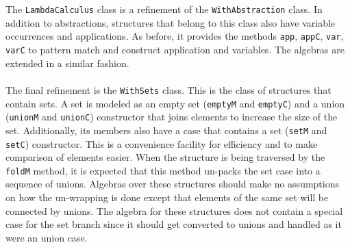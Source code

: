 \documentclass[8pt]{extarticle}
\begin{document}
\\\\
The \verb+LambdaCalculus+ class is a refinement of the \verb+WithAbstraction+ class. In addition to abstractions, structures that belong to this class also have variable occurrences and applications. As before, it provides the methods \verb+app+, \verb+appC+, \verb+var+, \verb+varC+ to pattern match and construct application and variables. The algebras are extended in a similar fashion.
\\\\
The final refinement is the \verb+WithSets+ class. This is the class of structures that contain sets. A set is modeled as an empty set (\verb+emptyM+ and \verb+emptyC+) and a union (\verb+unionM+ and \verb+unionC+) constructor that joins elements to increase the size of the set. Additionally, its members also have a case that contains a set (\verb+setM+ and \verb+setC+) constructor. This is a convenience facility for efficiency and to make comparison of elements easier. When the structure is being traversed by the \verb+foldM+ method, it is expected that this method un-packs the set case into a sequence of unions. Algebras over these structures should make no assumptions on how the un-wrapping is done except that elements of the same set will be connected by unions. The algebra for these structures does not contain a special case for the set branch since it should get converted to unions and handled as it were an union case.
\end{document}
